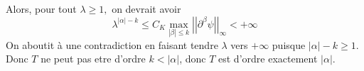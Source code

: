 \documentclass[3pt]{article}
\begin{document}
Alors, pour tout $\lambda \geq 1,$ on devrait avoir%
\begin{equation*}
\lambda ^{\left\vert \alpha \right\vert -k}\leq C_{K}\underset{\left\vert
\beta \right\vert \leq k}{\max }\left\vert \left\vert \partial ^{\beta }\psi
\right\vert \right\vert _{\infty }<+\infty 
\end{equation*}%
On aboutit \`{a} une contradiction en faisant tendre $\lambda $ vers $%
+\infty $ puisque $\left\vert \alpha \right\vert -k\geq 1$. Donc $T$ ne peut
pas etre d'ordre $k<\left\vert \alpha \right\vert $, donc $T$ est d'ordre
exactement $\left\vert \alpha \right\vert .$
\end{document}
